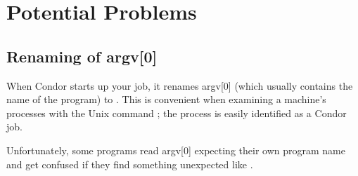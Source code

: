 \section{Potential Problems}

\subsection{Renaming of argv[0]}

When Condor starts up your job, it renames argv[0] (which usually
contains the name of the program) to .
This is
convenient when examining a machine's processes with the Unix
command ; the process
is easily identified as a Condor job.  

Unfortunately, some programs read argv[0] expecting their own program
name and get confused if they find something unexpected like
.

